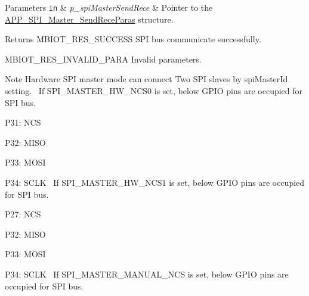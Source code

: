 \begin{DoxyParams}[1]{Parameters}
\mbox{\tt in}  & {\em p\+\_\+spi\+Master\+Send\+Rece} & Pointer to the \hyperlink{struct_a_p_p___s_p_i___master___send_rece_paras}{A\+P\+P\+\_\+\+S\+P\+I\+\_\+\+Master\+\_\+\+Send\+Rece\+Paras} structure.\\
\hline
\end{DoxyParams}
\begin{DoxyReturn}{Returns}
M\+B\+I\+O\+T\+\_\+\+R\+E\+S\+\_\+\+S\+U\+C\+C\+E\+SS S\+PI bus communicate successfully. 

M\+B\+I\+O\+T\+\_\+\+R\+E\+S\+\_\+\+I\+N\+V\+A\+L\+I\+D\+\_\+\+P\+A\+RA Invalid parameters.
\end{DoxyReturn}
\begin{DoxyNote}{Note}
Hardware S\+PI master mode can connect Two S\+PI slaves by spi\+Master\+Id setting.~\newline
 If S\+P\+I\+\_\+\+M\+A\+S\+T\+E\+R\+\_\+\+H\+W\+\_\+\+N\+C\+S0 is set, below G\+P\+IO pins are occupied for S\+PI bus.~\newline

\begin{DoxyItemize}
\item P31\+: N\+CS~\newline

\item P32\+: M\+I\+SO~\newline

\item P33\+: M\+O\+SI~\newline

\item P34\+: S\+C\+LK~\newline
 If S\+P\+I\+\_\+\+M\+A\+S\+T\+E\+R\+\_\+\+H\+W\+\_\+\+N\+C\+S1 is set, below G\+P\+IO pins are occupied for S\+PI bus.~\newline

\item P27\+: N\+CS~\newline

\item P32\+: M\+I\+SO~\newline

\item P33\+: M\+O\+SI~\newline

\item P34\+: S\+C\+LK~\newline
 If S\+P\+I\+\_\+\+M\+A\+S\+T\+E\+R\+\_\+\+M\+A\+N\+U\+A\+L\+\_\+\+N\+CS is set, below G\+P\+IO pins are occupied for S\+PI bus.~\newline


\end{DoxyItemize}
\end{DoxyNote}
